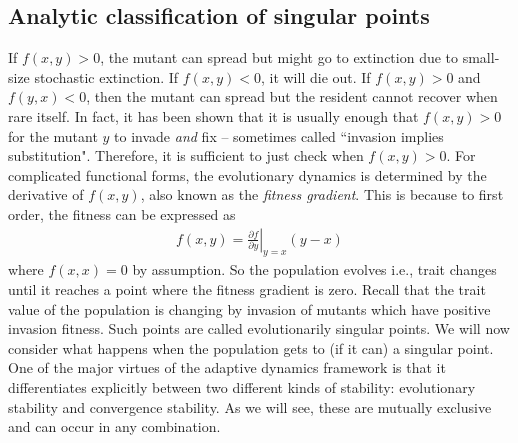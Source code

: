 \subsection{Analytic classification of singular points}

If $f(x,y)>0$, the mutant can spread but might go to extinction due to small-size stochastic extinction. 
If $f(x,y)<0$, it will die out. 
If $f(x,y)>0$ and $f(y,x)<0$, then the mutant can spread but the resident cannot recover when rare itself. 
In fact, it has been shown that it is usually enough that $f(x,y)>0$ for the mutant $y$ to invade \textit{and} fix -- sometimes called ``invasion implies substitution".  
Therefore, it is sufficient to just check when $f(x,y)>0$.
For complicated functional forms, the evolutionary dynamics is determined by the derivative of $f(x,y)$, also known as the \textit{fitness gradient}. 
This is because to first order, the fitness can be expressed as 
\begin{align}
	f(x,y) = \left. \frac{\partial f}{\partial y} \right|_{y=x} (y-x)
\end{align}
where $f(x,x) = 0$ by assumption. 
So the population evolves i.e., trait changes until it reaches a point where the fitness gradient is zero. 
Recall that the trait value of the population is changing by invasion of mutants which have positive invasion fitness. 
Such points are called evolutionarily singular points. 
We will now consider what happens when the population gets to (if it can) a singular point. 
One of the major virtues of the adaptive dynamics framework is that it differentiates explicitly between two different kinds of stability: evolutionary stability and convergence stability. 
As we will see, these are mutually exclusive and can occur in any combination. 

